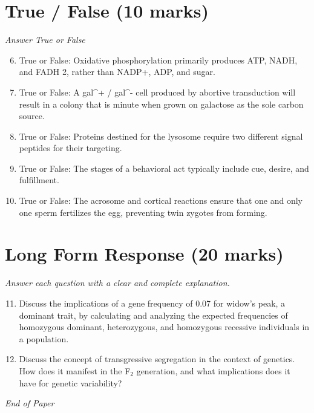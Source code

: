 \documentclass[12pt]{article}
\begin{document}
\section*{True / False (10 marks)}
\textit{Answer True or False}
\begin{enumerate}[label=\arabic*.]
\setcounter{enumi}{5}
\item True or False: Oxidative phosphorylation primarily produces ATP, NADH, and FADH 2, rather than NADP+, ADP, and sugar.
\item True or False: A gal^+ / gal^- cell produced by abortive transduction will result in a colony that is minute when grown on galactose as the sole carbon source.
\item True or False: Proteins destined for the lysosome require two different signal peptides for their targeting.
\item True or False: The stages of a behavioral act typically include cue, desire, and fulfillment.
\item True or False: The acrosome and cortical reactions ensure that one and only one sperm fertilizes the egg, preventing twin zygotes from forming.
\end{enumerate}

\section*{Long Form Response (20 marks)}
\textit{Answer each question with a clear and complete explanation.}
\begin{enumerate}[label=\arabic*.]
\setcounter{enumi}{10}
\item Discuss the implications of a gene frequency of 0.07 for widow's peak, a dominant trait, by calculating and analyzing the expected frequencies of homozygous dominant, heterozygous, and homozygous recessive individuals in a population.
\item Discuss the concept of transgressive segregation in the context of genetics. How does it manifest in the F$_{2}$ generation, and what implications does it have for genetic variability?
\end{enumerate}

\vfill
\noindent\textit{End of Paper}
\end{document}
